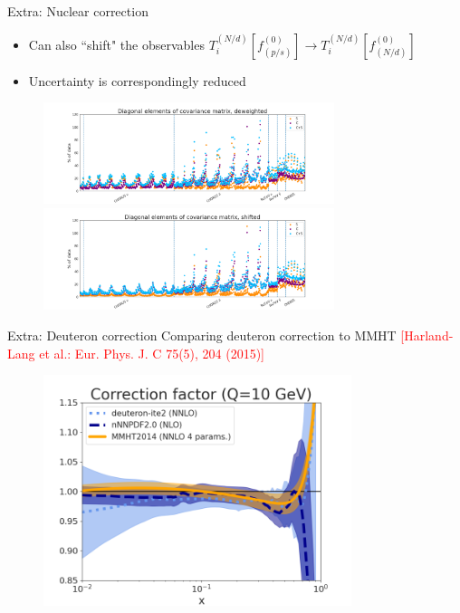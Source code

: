 \begin{frame}{Extra: Nuclear correction}
\begin{itemize}
\item Can also ``shift" the observables $T_i^{(N/d)}[f_(p/s)^{(0)}] \to T_i^{(N/d)}[f_{(N/d)}^{(0)}]$
\item Uncertainty is correspondingly reduced
\end{itemize}
  \begin{figure}
    \includegraphics[width=85mm]{nuclear_uncs/diagnuc_title.png}
    \includegraphics[width=85mm]{nuclear_uncs/diagnucshift.png}
  \end{figure}
\end{frame}
\begin{frame}{Extra: Deuteron correction}
Comparing deuteron correction to MMHT \tiny{ \textcolor{red}{[Harland-Lang et al.: Eur. Phys. J. C 75(5), 204 (2015)]}}
  \begin{figure}
    \includegraphics[width=90mm]{nuclear_uncs/corrfactor.png}
  \end{figure}
\end{frame}
